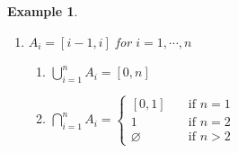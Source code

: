 \documentclass[12pt,a4paper]{article}
\newtheorem{eg}{Example}[subsection]
\newcounter{nprf}[subsection]
\newtheorem*{rmk}{\indent Remark}
\newenvironment*{prf}{\par\indent\textbf{\textit{Proof} (\stepcounter{nprf}\thenprf). }\par }{\par\hfill $\blacksquare$\par}
\def\Z{{\mathbb{Z}}}
\def\emptyset{\varnothing}
\begin{document}
\begin{eg}
\begin{enumerate}
\begin{enumerate}
			\item $\displaystyle\bigcap_{i=1}^n A_i=[0,1)$
			\begin{prf}
				Claim: $\displaystyle\bigcap_{i=1}^n A_i=[0,1).$\par($\subseteq$) Let $x\in\displaystyle\bigcap_{i=1}^n A_i.$\par\hspace{5mm}So, $x\in A_i\ \forall i\in\qty{1,2,\cdots,n}$.\par\hspace{5mm}Specifically, $x\in A_1=[0,1).\qquad\square$\par($\supseteq$) Let $x\in[0,1)$ $\quad$[WTS: $x\in A\ \forall i\in\qty{1,2,c\dots,n}$]\par\hspace{5mm}Let $k\in\qty{1,2,\cdots,n}.$ We will show $x\in A_k.$\par\hspace{5mm}We know that $k\geq1$ and $0\leq x<1,$ so we have $0\leq x<1\leq k.$\par\hspace{5mm}That is, $x\in[0,k).$\par\hspace{5mm}So, $x\in A_k$\par\hspace{5mm}Since $k\in\qty{1,2,\cdots,n}$ was \textbf{\textit{arbitrary}}, we have shown that $x\in A_k\ \forall k\in\qty{1,2,\cdots,n}.$\par\hspace{5mm}So, $x\in\displaystyle\bigcap_{i=1}^n A_i.$
			\end{prf}
		\end{enumerate}
		\begin{rmk} If $i\in\Z$, we have
		\begin{enumerate}
			\item $\displaystyle\bigcup_{i=1}^\infty A_i=[0,\infty)$
			\item $\displaystyle\bigcap_{i=1}^\infty A_i=[0,1)$
		\end{enumerate}\end{rmk}
		\item $A_i=[i-1,i]$ for $i=1,\cdots,n$
		\begin{enumerate}
			\item $\displaystyle\bigcup_{i=1}^n A_i=[0,n]$
			\item $\displaystyle\bigcap_{i=1}^n A_i=\begin{cases}[0,1]&\quad\text{if }n=1\\\qty{1}&\quad\text{if }n=2\\\emptyset&\quad\text{if }n>2\end{cases}$

\end{enumerate}
\end{enumerate}
\end{eg}
\end{document}
